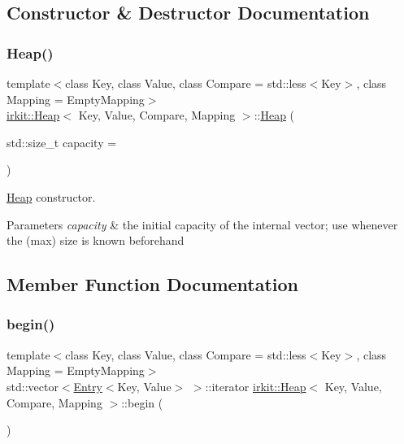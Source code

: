 \subsection{Constructor \& Destructor Documentation}
\mbox{\label{classirkit_1_1Heap_ac262b1efe6564321f3f8476dc8665eaf}} 
\subsubsection{\texorpdfstring{Heap()}{Heap()}}
{\footnotesize\ttfamily template$<$class Key, class Value, class Compare = std\+::less$<$\+Key$>$, class Mapping = Empty\+Mapping$>$ \\
\mbox{\hyperlink{classirkit_1_1Heap}{irkit\+::\+Heap}}$<$ Key, Value, Compare, Mapping $>$\+::\mbox{\hyperlink{classirkit_1_1Heap}{Heap}} (\begin{DoxyParamCaption}\item[{std\+::size\+\_\+t}]{capacity = {} }\end{DoxyParamCaption})\hspace{0.3cm}{\ttfamily [inline]}}

\mbox{\hyperlink{classirkit_1_1Heap}{Heap}} constructor.


\begin{DoxyParams}{Parameters}
{\em capacity} & the initial capacity of the internal vector; use whenever the (max) size is known beforehand \\
\hline
\end{DoxyParams}


\subsection{Member Function Documentation}
\mbox{\label{classirkit_1_1Heap_af996708917bb42b8cc660988c5c5ed62}} 
\subsubsection{\texorpdfstring{begin()}{begin()}}
{\footnotesize\ttfamily template$<$class Key, class Value, class Compare = std\+::less$<$\+Key$>$, class Mapping = Empty\+Mapping$>$ \\
std\+::vector$<$\mbox{\hyperlink{structirkit_1_1Entry}{Entry}}$<$Key, Value$>$ $>$\+::iterator \mbox{\hyperlink{classirkit_1_1Heap}{irkit\+::\+Heap}}$<$ Key, Value, Compare, Mapping $>$\+::begin (\begin{DoxyParamCaption}{ }\end{DoxyParamCaption})\hspace{0.3cm}{\ttfamily [inline]}}

